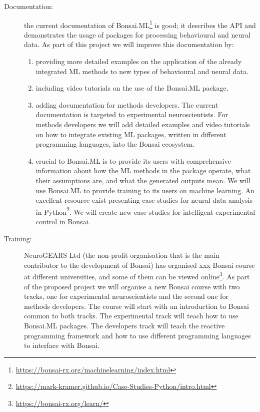 \begin{description}

    \item[Documentation:] the current documentation of
        Bonsai.ML\footnote[8]{\url{https://bonsai-rx.org/machinelearning/index.html}}
        is good; it describes the API and demonstrates the usage of packages
        for processing behavioural and neural data. As part of this project we
        will improve this documentation by:

    \begin{enumerate}

        \item providing more detailed examples on the application of the
            already integrated ML methods to new types of behavioural and
            neural data.

        \item including video tutorials on the use of the Bonsai.ML
            package.

        \item adding documentation for methods developers. The current
            documentation is targeted to experimental neuroscientists. For
            methods developers we will add detailed examples and video
            tutorials on how to integrate existing ML packages, written in
            different programming languages, into the Bonsai ecosystem.

        \item crucial to Bonsai.ML is to provide its users with comprehensive
            information about how the ML methods in the package operate, what
            their assumptions are, and what the generated outputs mean. We will
            use Bonsai.ML to provide training to its users on machine learning.
            An excellent resource exist presenting case studies for neural data
            analysis in
            Python\footnote[9]{\url{https://mark-kramer.github.io/Case-Studies-Python/intro.html}}.
            We will create new case studies for intelligent experimental
            control in Bonsai.

    \end{enumerate}

    \item[Training:] NeuroGEARS Ltd (the non-profit organisation that is the
        main contributor to the development of Bonsai) has organised xxx Bonsai
        course at different universities, and some of them can be viewed
        online\footnote[10]{\url{https://bonsai-rx.org/learn/}}. As part of the
        proposed project we will organise a new Bonsai course with two tracks,
        one for experimental neuroscientists and the second one for methods
        developers. The course will start with an introduction to Bonsai common
        to both tracks. The experimental track will teach how to use Bonsai.ML
        packages. The developers track will teach the reactive programming
        framework and how to use different programming languages to interface
        with Bonsai.


\end{description}
